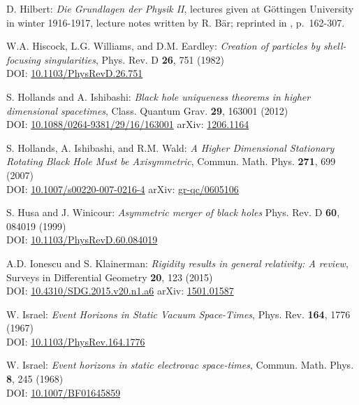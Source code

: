 \begin{thebibliography}{123}
D. Hilbert:
{\em Die Grundlagen der Physik II},
lectures given at Göttingen University in winter 1916-1917,
lecture notes written by R. Bär; reprinted
in \cite{SauerM09}, p.~162-307.

W.A. Hiscock, L.G. Williams, and D.M. Eardley:
{\em Creation of particles by shell-focusing singularities},
Phys. Rev. D {\bf 26}, 751 (1982)\\
DOI: \href{https://doi.org/10.1103/PhysRevD.26.751}{10.1103/PhysRevD.26.751}

S. Hollands and A. Ishibashi:
{\em Black hole uniqueness theorems in higher dimensional spacetimes},
Class. Quantum Grav. {\bf 29}, 163001 (2012)\\
DOI: \href{https://doi.org/10.1088/0264-9381/29/16/163001}{10.1088/0264-9381/29/16/163001}\hfill
arXiv: \href{https://arxiv.org/abs/1206.1164}{1206.1164}

S. Hollands, A. Ishibashi, and R.M. Wald:
{\em A Higher Dimensional Stationary Rotating Black Hole Must be Axisymmetric},
Commun. Math. Phys. {\bf 271}, 699 (2007)\\
DOI: \href{https://doi.org/10.1007/s00220-007-0216-4}{10.1007/s00220-007-0216-4}\hfill
arXiv: \href{https://arxiv.org/abs/gr-qc/0605106}{gr-qc/0605106}

S. Husa and J. Winicour:
{\em Asymmetric merger of black holes}
Phys. Rev. D {\bf 60}, 084019 (1999)\\
DOI: \href{https://doi.org/10.1103/PhysRevD.60.084019}{10.1103/PhysRevD.60.084019}

A.D. Ionescu and S. Klainerman:
{\em Rigidity results in general relativity: A review},
Surveys in Differential Geometry {\bf 20}, 123 (2015)\\
DOI: \href{https://dx.doi.org/10.4310/SDG.2015.v20.n1.a6}{10.4310/SDG.2015.v20.n1.a6}\hfill
arXiv: \href{https://arxiv.org/abs/1501.01587}{1501.01587}

W. Israel: {\em Event Horizons in Static Vacuum Space-Times},
Phys. Rev. {\bf 164}, 1776 (1967)\\
DOI: \href{https://doi.org/10.1103/PhysRev.164.1776}{10.1103/PhysRev.164.1776}

W. Israel: {\em Event horizons in static electrovac space-times},
Commun. Math. Phys. {\bf 8}, 245 (1968)\\
DOI: \href{https://doi.org/10.1007/BF01645859}{10.1007/BF01645859}


\end{thebibliography}
